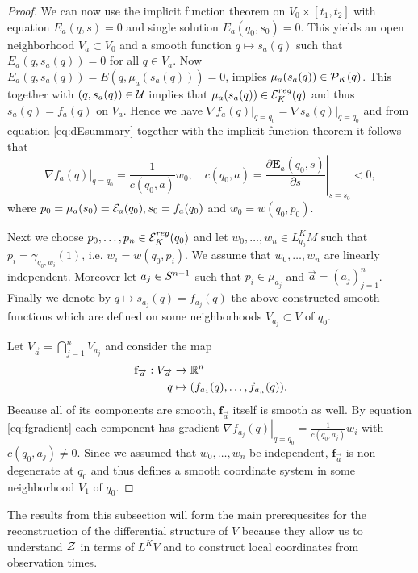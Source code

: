 \begin{proof}
    We can now use the implicit function theorem on $V_0\times [t_1,t_2]$ with equation $E_a(q,s)=0$ and single solution $E_a(q_0,s_0)=0$. This yields an open neighborhood $V_a\subset V_0$ and a smooth function $q\mapsto s_a(q)$ such that $E_a(q,s_a(q)) = 0$ for all $q \in V_a$. Now $E_a(q,s_a(q)) = E(q,\mu_a(s_a(q)))=0$, implies $\mu_a(s_a(q))\in {{\mathcal{P}}_K(q)}$. This together with $(q,s_a(q))\in \mathcal{U}$ implies that $\mu_a(s_a(q))\in {{\mathcal{E}}^{reg}_K}(q)$ and thus $s_a(q) = f_a(q)$ on $V_a$. Hence we have $\left.\nabla f_a(q)\right\rvert_{q=q_0} = \left.\nabla s_a(q)\right\rvert_{q=q_0}$ and from equation \ref{eq:dEsummary} together with the implicit function theorem it follows that 
    \begin{equation}\label{eq:fgradient}
        \left.\nabla f_a(q)\right\rvert_{q=q_0}  = \frac{1}{c(q_0,a)}w_0, \quad 
        c(q_0,a) = \left.\frac{\partial\mathbf{E}_a(q_0,s)}{\partial s}\right\rvert_{s=s_0} < 0,
    \end{equation}
    where $p_0 = \mu_a(s_0)={\mathcal{E}}_a(q_0), s_0 = f_a(q_0)$ and $w_0=w(q_0,p_0)$.
    
    Next we choose $p_0, \dots, p_n \in {{\mathcal{E}}^{reg}_K}(q_0)$ and let $w_0,\dots,w_n\in L^K_{q_0}M$ such that $p_i = \gamma_{q_0,w_i}(1)$, i.e. $w_i=w(q_0,p_i)$. We assume that $w_0,\dots,w_n$ are linearly independent. Moreover let $a_j \in {S^{n-1}}$ such that $p_i\in \mu_{a_j}$ and $\overrightarrow{a}=(a_j)^n_{j=1}$.
    Finally we denote by $q\mapsto s_{a_j}(q)=f_{a_j}(q)$ the above constructed smooth functions which are defined on some neighborhoods $V_{a_j}\subset V$ of $q_0$.
    
    Let $V_{\overrightarrow{a}} = \bigcap_{j=1}^n V_{a_j}$ and consider the map
    \begin{align*}
        \mathbf{f}_{\overrightarrow{a}}:V_{\overrightarrow{a}}&\to \mathbb{R}^n\\
        q&\mapsto (f_{a_1}(q),\dots,f_{a_n}(q)).
    \end{align*}
    Because all of its components are smooth, $\mathbf{f}_{\overrightarrow{a}}$ itself is smooth as well. By equation \ref{eq:fgradient} each component has gradient $\left.\nabla f_{a_j}(q)\right\rvert_{q=q_0} = \frac{1}{c(q_0,a_j)}w_i$ with $c(q_0,a_j)\neq 0$. Since we assumed that $w_0,\dots,w_n$ be independent, $\mathbf{f}_{\overrightarrow{a}}$ is non-degenerate at $q_0$ and thus defines a smooth coordinate system in some neighborhood $V_1$  of $q_0$.
\end{proof}
The results from this subsection will form the main prerequesites for the reconstruction of the differential structure of $V$ because they allow us to understand ${\mathcal{Z}}$ in terms of $L^KV$ and to construct local coordinates from observation times.

